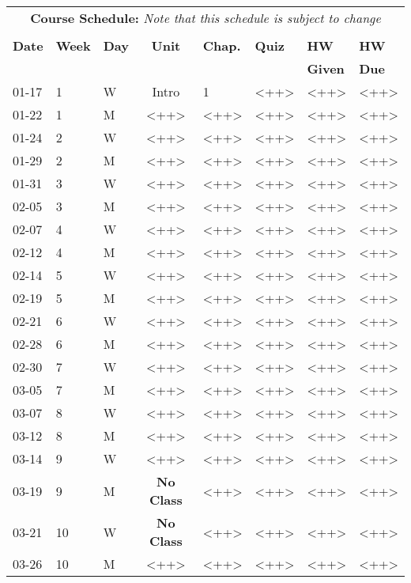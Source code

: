 \documentclass[11pt, a4paper]{article}
\begin{document}
\pagebreak
\FloatBarrier
\renewcommand{\arraystretch}{1}
\begin{table}[h]
\begin{center}
\begin{tabular}{lllcllll}
\multicolumn{8}{c}{\textbf{Course Schedule:}\textit{ Note that this schedule is subject to change}}\\
&&&&&&&\\
\textbf{Date} & \textbf{Week} & \textbf{Day} & \textbf{Unit} & \textbf{Chap.} & \textbf{Quiz} & \textbf{HW} & \textbf{HW}\\
 &  &  &  &  &                                                                                          & \textbf{Given} & \textbf{Due}\\
\hline
\hline
01-17 & 1 & W & Intro & 1 & <++> & <++> & <++> \\
01-22 & 1 & M & <++> & <++> & <++> & <++> & <++>\\
01-24 & 2 & W & <++> & <++> & <++> & <++> & <++>\\
01-29 & 2 & M & <++> & <++> & <++> & <++> & <++>\\
01-31 & 3 & W & <++> & <++> & <++> & <++> & <++>\\
02-05 & 3 & M & <++> & <++> & <++> & <++> & <++>\\
02-07 & 4 & W & <++> & <++> & <++> & <++> & <++>\\
02-12 & 4 & M & <++> & <++> & <++> & <++> & <++>\\
02-14 & 5 & W & <++> & <++> & <++> & <++> & <++>\\
02-19 & 5 & M & <++> & <++> & <++> & <++> & <++>\\
02-21 & 6 & W & <++> & <++> & <++> & <++> & <++>\\
02-28 & 6 & M & <++> & <++> & <++> & <++> & <++>\\
02-30 & 7 & W & <++> & <++> & <++> & <++> & <++>\\
03-05 & 7 & M & <++> & <++> & <++> & <++> & <++>\\
03-07 & 8 & W & <++> & <++> & <++> & <++> & <++>\\
03-12 & 8 & M & <++> & <++> & <++> & <++> & <++>\\
03-14 & 9 & W & <++> & <++> & <++> & <++> & <++>\\
03-19 & 9 & M & \textbf{No Class} & <++> & <++> & <++> & <++>\\
03-21 & 10 & W & \textbf{No Class} & <++> & <++> & <++> & <++>\\
03-26 & 10 & M & <++> & <++> & <++> & <++> & <++>\\

\end{tabular}
\end{center}
\end{table}
\end{document}
